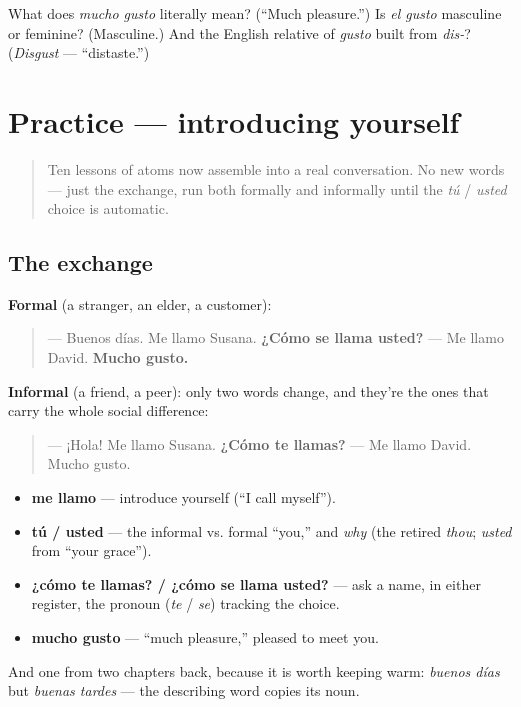 \begin{tcolorbox}[breakable,colback=teal!4,colframe=teal!35!black,title={Before you move on}]
What does \emph{mucho gusto} literally mean? (\textquotedblleft{}Much pleasure.\textquotedblright{}) Is \emph{el gusto} masculine or feminine? (Masculine.) And the English relative of \emph{gusto} built from \emph{dis-}? (\emph{Disgust} — \textquotedblleft{}distaste.\textquotedblright{})
\end{tcolorbox}
\section[Practice]{Practice — introducing yourself}

\label{lesson:ES-C03-practice}



\begin{quote}
Ten lessons of atoms now assemble into a real conversation. No new words — just the exchange, run both formally and informally until the \emph{tú} / \emph{usted} choice is automatic.
\end{quote}

\subsection*{The exchange}
\textbf{Formal} (a stranger, an elder, a customer):

\begin{quote}
— Buenos días. Me llamo Susana. \textbf{¿Cómo se llama usted?} — Me llamo David. \textbf{Mucho gusto.}
\end{quote}

\textbf{Informal} (a friend, a peer): only two words change, and they're the ones that carry the whole social difference:

\begin{quote}
— ¡Hola! Me llamo Susana. \textbf{¿Cómo te llamas?} — Me llamo David. Mucho gusto.
\end{quote}

\begin{grammarlens}[title={What you've built}]
\begin{itemize}
\raggedright
  \item \textbf{me llamo} — introduce yourself (\textquotedblleft{}I call myself\textquotedblright{}).
  \item \textbf{tú / usted} — the informal vs. formal \textquotedblleft{}you,\textquotedblright{} and \emph{why} (the retired \emph{thou}; \emph{usted} from \textquotedblleft{}your grace\textquotedblright{}).
  \item \textbf{¿cómo te llamas? / ¿cómo se llama usted?} — ask a name, in either register, the pronoun (\emph{te} / \emph{se}) tracking the choice.
  \item \textbf{mucho gusto} — \textquotedblleft{}much pleasure,\textquotedblright{} pleased to meet you.
\end{itemize}

And one from two chapters back, because it is worth keeping warm: \emph{buenos días} but \emph{buenas tardes} — the describing word copies its noun.
\end{grammarlens}

